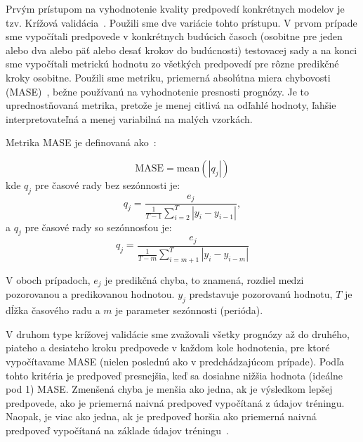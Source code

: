 \documentclass[thesismargins, thesislinespacing, openright, upjsfrontpage, combineabstracts]{rnthesis}
\begin{document}
Prvým prístupom na vyhodnotenie kvality predpovedí konkrétnych modelov je tzv. Krížová validácia~\cite {hyndman2018forecasting}. Použili sme dve variácie tohto prístupu. V prvom prípade sme vypočítali predpovede v konkrétnych budúcich časoch (osobitne pre jeden alebo dva alebo päť alebo desať krokov do budúcnosti) testovacej sady a na konci sme vypočítali metrickú hodnotu zo všetkých predpovedí pre rôzne predikčné kroky osobitne. Použili sme metriku, priemerná absolútna miera chybovosti (MASE)~\cite{hyndman2006another}, bežne používanú na vyhodnotenie presnosti prognózy.
Je to uprednostňovaná metrika, pretože je menej citlivá na odľahlé hodnoty, ľahšie interpretovateľná a menej variabilná na malých vzorkách.

Metrika MASE je definovaná ako~\cite{hyndman2018forecasting}:

% 
\begin{equation}
\textrm{MASE} = \textrm{mean}(|q_j|)
\end{equation}
% 
kde $q_j$ pre časové rady bez sezónnosti je:
% 
\begin{equation} 
q_j= \frac{e_j}{\frac{1}{T-1} \sum_{i=2}^{T}|y_i - y_{i-1}|},
\end{equation}
% 
a $q_j$ pre časové rady so sezónnosťou je:
% 
\begin{equation} 
q_j = \frac{e_j}{\frac{1}{T-m} \sum_{i=m+1}^{T}|y_i - y_{i-m}|}
\end{equation}

V oboch prípadoch, $e_j$ je predikčná chyba, to znamená, rozdiel medzi pozorovanou a predikovanou hodnotou. $y_j$ predstavuje pozorovanú hodnotu, $T$ je dĺžka časového radu a $m$ je parameter sezónnosti (perióda).

V druhom type krížovej validácie sme zvažovali všetky prognózy až do druhého, piateho a desiateho kroku predpovede v každom kole hodnotenia, pre ktoré vypočítavame MASE (nielen poslednú ako v predchádzajúcom prípade). Podľa tohto kritéria je predpoveď presnejšia, keď sa dosiahne nižšia hodnota (ideálne pod 1) MASE. Zmenšená chyba je menšia ako jedna, ak je výsledkom lepšej predpovede, ako je priemerná naivná predpoveď vypočítaná z údajov tréningu. Naopak, je viac ako jedna, ak je predpoveď horšia ako priemerná naivná predpoveď vypočítaná na základe údajov tréningu~\cite{hyndman2014measuring}.
\end{document}
